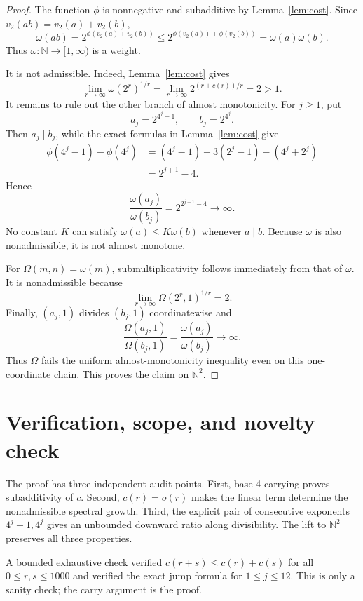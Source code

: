 \documentclass[11pt]{article}
\theoremstyle{remark}
\newcommand{\N}{\mathbb N}
\newcommand{\vTwo}{v_2}
\begin{document}
\begin{proof}
The function $\phi$ is nonnegative and subadditive by
Lemma~\ref{lem:cost}. Since $\vTwo(ab)=\vTwo(a)+\vTwo(b)$,
\[
 \omega(ab)
 =2^{\phi(\vTwo(a)+\vTwo(b))}
 \leq2^{\phi(\vTwo(a))+\phi(\vTwo(b))}
 =\omega(a)\omega(b).
\]
Thus $\omega:\N\to[1,\infty)$ is a weight.

It is not admissible. Indeed, Lemma~\ref{lem:cost} gives
\[
 \lim_{r\to\infty}\omega(2^r)^{1/r}
 =\lim_{r\to\infty}2^{(r+c(r))/r}=2>1.
\]
It remains to rule out the other branch of almost monotonicity. For $j\geq1$,
put
\[
 a_j=2^{4^j-1},\qquad b_j=2^{4^j}.
\]
Then $a_j\mid b_j$, while the exact formulas in Lemma~\ref{lem:cost} give
\begin{align*}
 \phi(4^j-1)-\phi(4^j)
 &= (4^j-1)+3(2^j-1)-(4^j+2^j)\\
 &=2^{j+1}-4.
\end{align*}
Hence
\[
 \frac{\omega(a_j)}{\omega(b_j)}
 =2^{2^{j+1}-4}\longrightarrow\infty.
\]
No constant $K$ can satisfy $\omega(a)\leq K\omega(b)$ whenever $a\mid b$.
Because $\omega$ is also nonadmissible, it is not almost monotone.

For $\Omega(m,n)=\omega(m)$, submultiplicativity follows immediately from
that of $\omega$. It is nonadmissible because
\[
 \lim_{r\to\infty}\Omega(2^r,1)^{1/r}=2.
\]
Finally, $(a_j,1)$ divides $(b_j,1)$ coordinatewise and
\[
 \frac{\Omega(a_j,1)}{\Omega(b_j,1)}
 =\frac{\omega(a_j)}{\omega(b_j)}\longrightarrow\infty.
\]
Thus $\Omega$ fails the uniform almost-monotonicity inequality even on this
one-coordinate chain. This proves the claim on $\N^2$.
\end{proof}

\section{Verification, scope, and novelty check}

The proof has three independent audit points. First, base-4 carrying proves
subadditivity of $c$. Second, $c(r)=o(r)$ makes the linear term determine the
nonadmissible spectral growth. Third, the explicit pair of consecutive
exponents $4^j-1,4^j$ gives an unbounded downward ratio along divisibility.
The lift to $\N^2$ preserves all three properties.

A bounded exhaustive check verified $c(r+s)\leq c(r)+c(s)$ for all
$0\leq r,s\leq1000$ and verified the exact jump formula for $1\leq j\leq12$.
This is only a sanity check; the carry argument is the proof.
\end{document}
